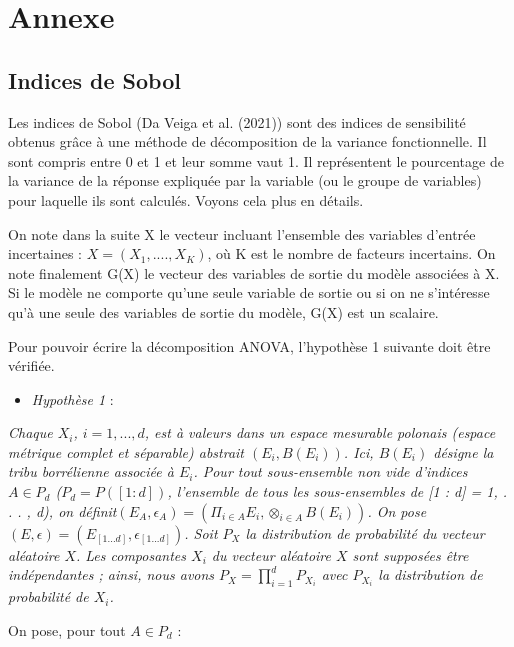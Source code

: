 \documentclass[
]{article}
\providecommand{\tightlist}{%
  \setlength{\itemsep}{0pt}\setlength{\parskip}{0pt}}
\begin{document}
\hypertarget{annexe}{%
\section{Annexe}\label{annexe}}

\hypertarget{indices-de-sobol}{%
\subsection{Indices de Sobol}\label{indices-de-sobol}}

Les indices de Sobol (Da Veiga et al. (2021)) sont des indices de
sensibilité obtenus grâce à une méthode de décomposition de la variance
fonctionnelle. Il sont compris entre 0 et 1 et leur somme vaut 1. Il
représentent le pourcentage de la variance de la réponse expliquée par
la variable (ou le groupe de variables) pour laquelle ils sont calculés.
Voyons cela plus en détails.

On note dans la suite X le vecteur incluant l'ensemble des variables
d'entrée incertaines : \(X = (X_1 ,...., X_K)\), où K est le nombre de
facteurs incertains. On note finalement G(X) le vecteur des variables de
sortie du modèle associées à X. Si le modèle ne comporte qu'une seule
variable de sortie ou si on ne s'intéresse qu'à une seule des variables
de sortie du modèle, G(X) est un scalaire.

Pour pouvoir écrire la décomposition ANOVA, l'hypothèse 1 suivante doit
être vérifiée.

\begin{itemize}
\tightlist
\item
  \textit{Hypothèse 1} :
\end{itemize}

\textit{Chaque \(X_i\), \(i = 1, . . . , d\), est à valeurs dans un espace mesurable polonais (espace métrique complet et séparable) abstrait \((E_i, B(E_i))\). Ici, \(B(E_i)\) désigne la tribu borrélienne associée à \(E_i\). Pour tout sous-ensemble non vide d'indices \(A \in P_d\) (\(P_d = P([1 : d])\), l'ensemble de tous les sous-ensembles de [1 : d] = {1, . . . , d}), on définit\((E_A, \epsilon_A) = (\Pi_{i\in A} E_i, \otimes_{i\in A} B(E_i))\). On pose \((E,\epsilon)=(E_{[1...d]},\epsilon_{[1...d]})\). Soit \(P_X\) la distribution de probabilité du vecteur aléatoire \(X\). Les composantes \(X_i\) du vecteur aléatoire \(X\) sont supposées être indépendantes ; ainsi, nous avons \(P_X = \prod_{i=1}^{d} P_{X_i}\) avec \(P_{X_i}\) la distribution de probabilité de \(X_i\).}

On pose, pour tout \(A \in P_{d}\) :
\end{document}
